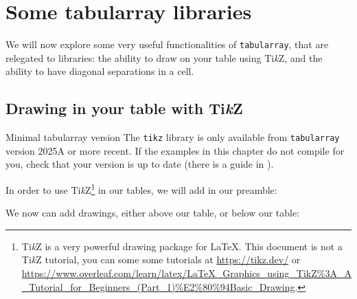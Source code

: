 \chapter{Some tabularray libraries}\label{sec:libraries}

We will now explore some very useful functionalities of \texttt{tabularray}, that are relegated to libraries: the ability to draw on your table using Ti\emph{k}Z, and the ability to have diagonal separations in a cell.

\section{Drawing in your table with Ti\emph{k}Z}
\begin{warningbox}{Minimal tabularray version}
The \texttt{tikz} library is only available from \texttt{tabularray} version 2025A or more recent. If the examples in this chapter do not compile for you, check that your version is up to date (there is a guide in ).
\end{warningbox}

In order to use Ti\emph{k}Z\footnote{Ti\emph{k}Z is a very powerful drawing package for \LaTeX. This document is not a Ti\emph{k}Z tutorial, you can some some tutorials at \url{https://tikz.dev/} or \url{https://www.overleaf.com/learn/latex/LaTeX_Graphics_using_TikZ\%3A_A_Tutorial_for_Beginners_(Part_1)\%E2\%80\%94Basic_Drawing}.} in our tables, we will add  in our preamble:


We now can add drawings, either above our table, or below our table:

\begin{Code}
\begin{tblrtikzbelow}
\end{tblrtikzbelow}

\begin{tblrtikzabove}
\end{tblrtikzabove}

\begin{tblr}{}
\end{tblr}
\end{Code}

